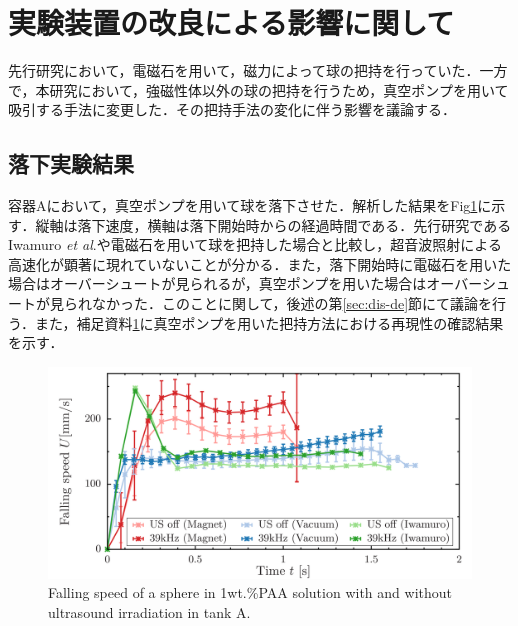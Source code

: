 \section{実験装置の改良による影響に関して}
\label{sec:reexp}

先行研究\cite{ref:8}において，電磁石を用いて，磁力によって球の把持を行っていた．一方で，本研究において，強磁性体以外の球の把持を行うため，真空ポンプを用いて吸引する手法に変更した．その把持手法の変化に伴う影響を議論する．



\subsection{落下実験結果}

容器Aにおいて，真空ポンプを用いて球を落下させた．解析した結果をFig\ref{fig:falling-A}に示す．縦軸は落下速度，横軸は落下開始時からの経過時間である．先行研究であるIwamuro \textit{et al}.\cite{ref:8}や電磁石を用いて球を把持した場合と比較し，超音波照射による高速化が顕著に現れていないことが分かる．また，落下開始時に電磁石を用いた場合はオーバーシュートが見られるが，真空ポンプを用いた場合はオーバーシュートが見られなかった．このことに関して，後述の第\ref{sec:dis-de}節にて議論を行う．また，補足資料\ref{sec:reexp}に真空ポンプを用いた把持方法における再現性の確認結果を示す．

\begin{figure}[ht]
    \centering
    \includegraphics[width=12cm,clip]{./4-Results/s1-A.png}
    \caption{Falling speed of a sphere in 1wt.\%PAA solution with and without ultrasound irradiation in tank A.}
    \label{fig:falling-A}
\end{figure}
